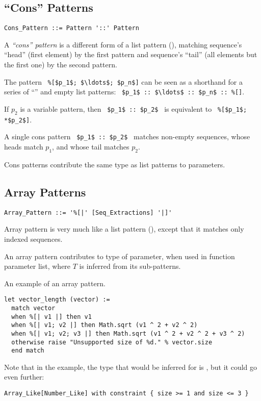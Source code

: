 \subsection{``Cons'' Patterns}
\label{sec:cons-patterns}

\grammar\begin{lstlisting}
Cons_Pattern ::= Pattern '::' Pattern
\end{lstlisting}

A {\em ``cons'' pattern} is a different form of a list pattern (), matching sequence's ``head'' (first element) by the first pattern and sequence's ``tail'' (all elements but the first one) by the second pattern. 

The pattern ~\lstinline!%[$p_1$; $\ldots$; $p_n$]! can be seen as a shorthand for a series of ``\code{::}'' and empty list patterns: ~\lstinline!$p_1$ :: $\ldots$ :: $p_n$ :: %[]!. 

If $p_2$ is a variable pattern, then ~\lstinline!$p_1$ :: $p_2$!~ is equivalent to ~\lstinline!%[$p_1$; *$p_2$]!. 

A single cons pattern ~\lstinline!$p_1$ :: $p_2$!~ matches non-empty sequences, whose heads match $p_1$, and whose tail matches $p_2$. 

Cons patterns contribute the same type as list patterns to parameters. 





\subsection{Array Patterns}
\label{sec:array-patterns}

\grammar\begin{lstlisting}
Array_Pattern ::= '%[|' [Seq_Extractions] '|]'
\end{lstlisting}

Array pattern is very much like a list pattern (), except that it matches only indexed sequences. 

An array pattern contributes  to type of parameter, when used in function parameter list, where $T$ is inferred from its sub-patterns. 

\example An example of an array pattern.
\begin{lstlisting}[deletekeywords={of}]
let vector_length (vector) := 
  match vector 
  when %[| v1 |] then v1
  when %[| v1; v2 |] then Math.sqrt (v1 ^ 2 + v2 ^ 2)
  when %[| v1; v2; v3 |] then Math.sqrt (v1 ^ 2 + v2 ^ 2 + v3 ^ 2)
  otherwise raise "Unsupported size of %d." % vector.size
  end match
\end{lstlisting}
Note that in the example, the type that would be inferred for  is , but it could go even further: 
\begin{lstlisting}Array_Like[Number_Like] with constraint { size >= 1 and size <= 3 }
\end{lstlisting}






